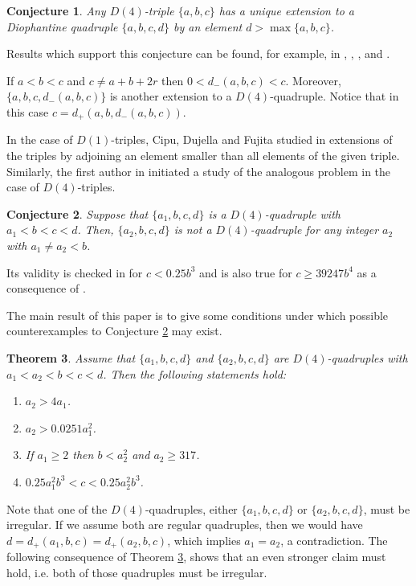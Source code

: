 \documentclass[12pt]{amsart}%
\newtheorem{theorem}{Theorem}[section]
\theoremstyle{definition}
\theoremstyle{remark}
\theoremstyle{plain}
\newtheorem{conj}[theorem]{Conjecture}
\begin{document}
\begin{conj}\label{conj_1}
Any $D(4)$-triple $\{a,b,c\}$ has a unique extension to a Diophantine quadruple $\{a,b,c,d\}$ by an element $d>\max\{a,b,c\}$.
\end{conj}
 
Results which support this conjecture can be found, for example, in \cite{bf}, \cite{mbt}, \cite{dujram}, \cite{fil_par} and \cite{fht}.


If $a<b<c$ and $c\neq a+b+2r$ then $0<d_-(a,b,c)<c$. Moreover, $\{a,b,c,d_-(a,b,c)\}$ is another extension to a $D(4)$-quadruple. Notice that in this case $c=d_+(a,b,d_-(a,b,c))$.

In the case of $D(1)$-triples, Cipu, Dujella and Fujita studied in \cite{cdf} extensions of the triples by adjoining an element smaller than all elements of the given triple. Similarly, the first author in \cite{mbtap1} initiated a study of the analogous problem in the case of $D(4)$-triples. 

\begin{conj}\label{conj_2}
    Suppose that $\{a_1, b, c, d\}$ is a $D(4)$-quadruple with $a_1<b<c<d$. Then, $\{a_2, b, c, d\}$ is not a $D(4)$-quadruple for any
integer $a_2$ with $a_1\neq a_2<b$.
\end{conj}

Its validity is checked in \cite{mbtap1} for $c < 0.25b^3$ and is also true for $c\geq 39247b^4$ as a consequence of \cite[Theorem 1.6]{mbt}.

The main result of this paper is to give some conditions under which possible counterexamples to Conjecture \ref{conj_2} may exist.

\begin{theorem}\label{glavni}
    Assume that $\{a_1,b,c,d\}$ and $\{a_2,b,c,d\}$ are $D(4)$-quadruples with $a_1<a_2<b<c<d$. Then the following statements hold:
    \begin{enumerate}[1)]
    \item $a_2>4a_1$.
        \item $a_2>0.0251a_1^2$. 
        \item If $a_1\geq 2$ then $b<a_2^2$ and $a_2\geq 317$.
        \item $0.25a_1^2b^3 < c < 0.25a_2^2b^3$.
    \end{enumerate}
\end{theorem}
Note that one of the $D(4)$-quadruples, either $\{a_1, b, c, d\}$ or $\{a_2, b, c, d\}$, must be irregular. If we assume both are regular quadruples, then we would have $d = d_+(a_1, b, c) = d_+(a_2, b, c)$, which implies $a_1 = a_2$, a contradiction. The following
consequence of Theorem \ref{glavni}, 
shows that an even stronger claim must hold, i.e. both of those quadruples must be irregular.
\end{document}
